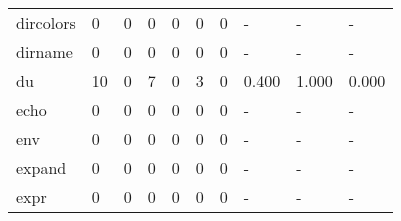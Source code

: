 \begin{longtable}{lp{2.0cm}p{2.0cm}p{2.0cm}p{2.0cm}p{2.0cm}p{2.0cm}p{2.0cm}p{2.0cm}p{2.0cm}}
dircolors &                      0 &                                  0 &                                 0 &                                0 &                                 0 &                               0 &                                    - &                                      - &                                    - \\
dirname   &                      0 &                                  0 &                                 0 &                                0 &                                 0 &                               0 &                                    - &                                      - &                                    - \\
du        &                     10 &                                  0 &                                 7 &                                0 &                                 3 &                               0 &                                0.400 &                                  1.000 &                                0.000 \\
echo      &                      0 &                                  0 &                                 0 &                                0 &                                 0 &                               0 &                                    - &                                      - &                                    - \\
env       &                      0 &                                  0 &                                 0 &                                0 &                                 0 &                               0 &                                    - &                                      - &                                    - \\
expand    &                      0 &                                  0 &                                 0 &                                0 &                                 0 &                               0 &                                    - &                                      - &                                    - \\
expr      &                      0 &                                  0 &                                 0 &                                0 &                                 0 &                               0 &                                    - &                                      - &                                    - \\

\end{longtable}
